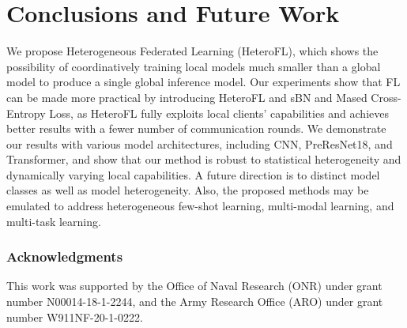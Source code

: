 \documentclass{article} %
\begin{document}
\section{Conclusions and Future Work}
\vspace{-0.2cm}
We propose Heterogeneous Federated Learning (HeteroFL), which shows the possibility of coordinatively training local models much smaller than a global model to produce a single global inference model. Our experiments show that FL can be made more practical by introducing HeteroFL and sBN and Mased Cross-Entropy Loss, as HeteroFL fully exploits local clients' capabilities and achieves better results with a fewer number of communication rounds. We demonstrate our results with various model architectures, including CNN, PreResNet18, and Transformer, and show that our method is robust to statistical heterogeneity and dynamically varying local capabilities. A future direction is to distinct model classes as well as model heterogeneity. Also, the proposed methods may be emulated to address heterogeneous few-shot learning, multi-modal learning, and multi-task learning.





\subsubsection*{Acknowledgments}
This work was supported by the Office of Naval Research (ONR) under grant number N00014-18-1-2244, and the Army Research Office (ARO) under grant number W911NF-20-1-0222.





\clearpage

\appendix
\end{document}

